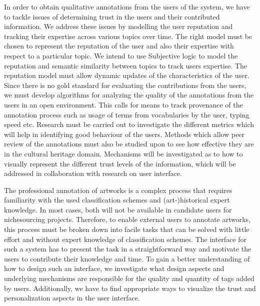 In order to obtain qualitative annotations from the users of the system, we have to tackle issues of determining trust in the users and their contributed information. We address these issues by modelling the user reputation and tracking their expertise across various topics over time. The right model must be chosen to represent the reputation of the user and also their expertise with respect to a particular topic. We intend to use Subjective logic to model the reputation and semantic similarity between topics to track users expertise. The reputation model must allow dynamic updates of the characteristics of the user. Since there is no gold standard for evaluating the contributions from the users, we must develop algorithms for analyzing the quality of the annotations from the users in an open environment. This calls for means to track provenance of the annotation process such as usage of terms from vocabularies by the user, typing speed etc. Research must be carried out to investigate the different metrics which will help in identifying good behaviour of the users. Methods which allow peer review of the annotations must also be studied upon to see how effective they are in the cultural heritage domain. Mechanisms will be investigated as to how to visually represent the different trust levels of the information, which will be addressed in collaboration with research on user interface.

The professional annotation of artworks is a complex process that requires familiarity with the used classification schemes and (art-)historical expert knowledge. In most cases, both will not be available in candidate users for nichesourcing projects. Therefore, to enable external users to annotate artworks, this process must be broken down into facile tasks that can be solved with little effort and without expert knowledge of classification schemes.
The interface for such a system has to present the task in a straightforward way and motivate the users to contribute their knowledge and time.
To gain a better understanding of how to design such an interface, we investigate what design aspects and underlying mechanisms are responsible for the quality and quantity of tags added by users.
Additionally, we have to find appropriate ways to visualize the trust and personalization aspects in the user interface.
